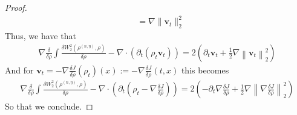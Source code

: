 \documentclass[10pt,a4paper]{amsart}
\newcommand{\wagrad}{\nabla \frac{\delta J}{\delta \rho}}
\begin{document}
\begin{proof}
\begin{align*}
        &= \nabla \lVert \mathbf{v}_{t} \rVert_{2}^{2}
    \end{align*}
    Thus, we have that 
    \begin{align*}
        \nabla\frac{\delta}{\delta\rho} \int \frac{\delta W_{2}^{2}(\rho^{(n,\eta)}, \rho) }{\delta \rho} - \nabla\cdot\left( \partial_{t} (\rho_{t} \mathbf{v}_{t}  
    ) \right) = 2 \left( \partial_{t} \mathbf{v}_{t} +\frac{1}{2}\nabla \left\lVert \mathbf{v}_{t} \right\rVert_{2}^{2} \right)
    \end{align*}
    And for $\mathbf{v}_{t} = - \wagrad(\rho_{t}) (x) := - \wagrad(t, x)$ this becomes
    \begin{align*}
        \nabla\frac{\delta}{\delta\rho} \int \frac{\delta W_{2}^{2}(\rho^{(n,\eta)}, \rho) }{\delta \rho} - \nabla\cdot\left( \partial_{t} (\rho_{t} -\wagrad  
    ) \right) = 2 \left( - \partial_{t} \wagrad + \frac{1}{2}\nabla \left\lVert \wagrad \right\rVert_{2}^{2} \right)
    \end{align*}
    So that we conclude.
\end{proof}
\end{document}
